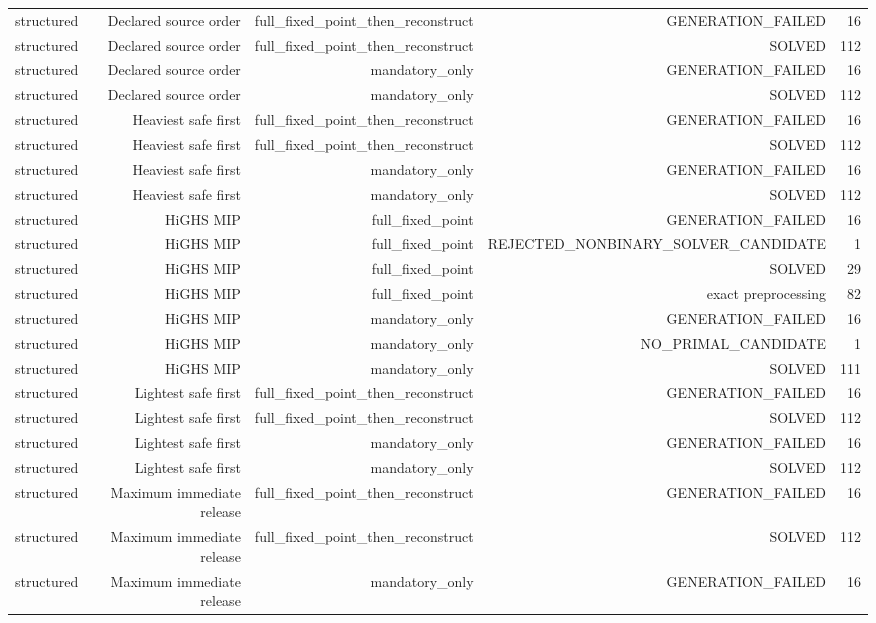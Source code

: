 {\begin{longtable}{lrrrr}
structured & Declared source order & full\_fixed\_point\_then\_reconstruct & GENERATION\_FAILED & 16 \\
structured & Declared source order & full\_fixed\_point\_then\_reconstruct & SOLVED & 112 \\
structured & Declared source order & mandatory\_only & GENERATION\_FAILED & 16 \\
structured & Declared source order & mandatory\_only & SOLVED & 112 \\
structured & Heaviest safe first & full\_fixed\_point\_then\_reconstruct & GENERATION\_FAILED & 16 \\
structured & Heaviest safe first & full\_fixed\_point\_then\_reconstruct & SOLVED & 112 \\
structured & Heaviest safe first & mandatory\_only & GENERATION\_FAILED & 16 \\
structured & Heaviest safe first & mandatory\_only & SOLVED & 112 \\
structured & HiGHS MIP & full\_fixed\_point & GENERATION\_FAILED & 16 \\
structured & HiGHS MIP & full\_fixed\_point & REJECTED\_NONBINARY\_SOLVER\_CANDIDATE & 1 \\
structured & HiGHS MIP & full\_fixed\_point & SOLVED & 29 \\
structured & HiGHS MIP & full\_fixed\_point & exact preprocessing & 82 \\
structured & HiGHS MIP & mandatory\_only & GENERATION\_FAILED & 16 \\
structured & HiGHS MIP & mandatory\_only & NO\_PRIMAL\_CANDIDATE & 1 \\
structured & HiGHS MIP & mandatory\_only & SOLVED & 111 \\
structured & Lightest safe first & full\_fixed\_point\_then\_reconstruct & GENERATION\_FAILED & 16 \\
structured & Lightest safe first & full\_fixed\_point\_then\_reconstruct & SOLVED & 112 \\
structured & Lightest safe first & mandatory\_only & GENERATION\_FAILED & 16 \\
structured & Lightest safe first & mandatory\_only & SOLVED & 112 \\
structured & Maximum immediate release & full\_fixed\_point\_then\_reconstruct & GENERATION\_FAILED & 16 \\
structured & Maximum immediate release & full\_fixed\_point\_then\_reconstruct & SOLVED & 112 \\
structured & Maximum immediate release & mandatory\_only & GENERATION\_FAILED & 16 \\

\end{longtable}}
